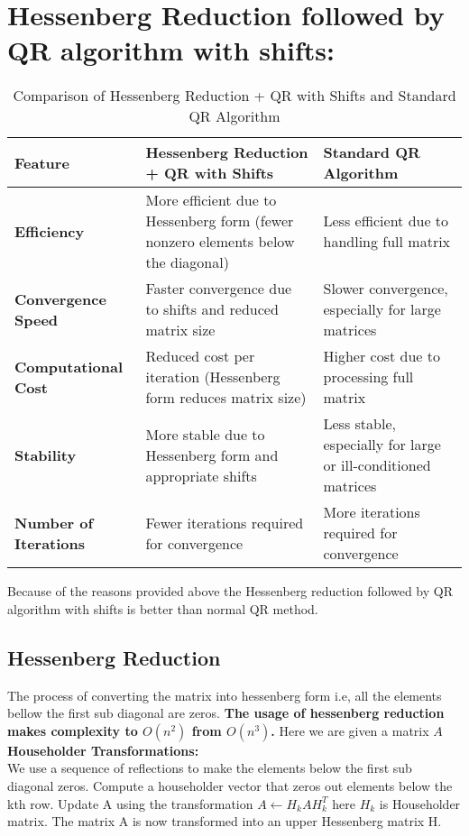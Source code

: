 \documentclass[a4paper,12pt]{article}
\begin{document}
\section{Hessenberg Reduction followed by QR algorithm with shifts:}
\begin{table}[h!]
\centering
\hspace{-1cm}  %
\begin{tabular}{|l|p{5cm}|p{5cm}|}  %
\hline
\textbf{Feature} & \textbf{Hessenberg Reduction + QR with Shifts} & \textbf{Standard QR Algorithm} \\ \hline
\textbf{Efficiency} & More efficient due to Hessenberg form (fewer nonzero elements below the diagonal) & Less efficient due to handling full matrix \\ \hline
\textbf{Convergence Speed} & Faster convergence due to shifts and reduced matrix size & Slower convergence, especially for large matrices \\ \hline
\textbf{Computational Cost} & Reduced cost per iteration (Hessenberg form reduces matrix size) & Higher cost due to processing full matrix \\ \hline
\textbf{Stability} & More stable due to Hessenberg form and appropriate shifts & Less stable, especially for large or ill-conditioned matrices \\ \hline
\textbf{Number of Iterations} & Fewer iterations required for convergence & More iterations required for convergence \\ \hline
\end{tabular}
\caption{Comparison of Hessenberg Reduction + QR with Shifts and Standard QR Algorithm}
\end{table}
Because of the reasons provided above the Hessenberg reduction followed by QR algorithm with shifts is better than normal QR method.
\subsection{Hessenberg Reduction}
The process of converting the matrix into hessenberg form i.e, all the elements bellow the first sub diagonal are zeros. \textbf{The usage of hessenberg reduction makes complexity to $O(n^2)$ from $O(n^3)$.} 
Here we are given a matrix $A$\\
\textbf{Householder Transformations:}\\
We use a sequence of reflections to make the elements below the first sub diagonal zeros. Compute a householder vector that zeros out elements below the kth row. Update A using the transformation $A\leftarrow H_kAH_k^T$ here $H_k$ is Householder matrix. The matrix A is now transformed into an upper Hessenberg matrix H.
\end{document}
